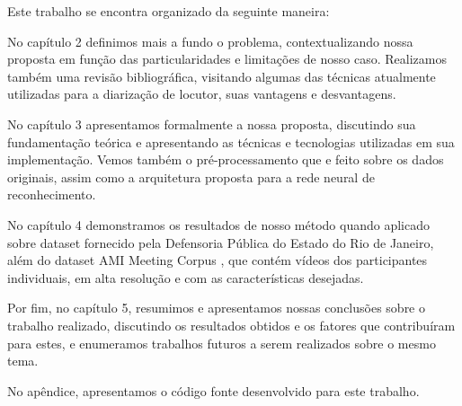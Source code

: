 Este trabalho se encontra organizado da seguinte maneira:


No capítulo 2 definimos mais a fundo o problema, contextualizando nossa proposta em função das particularidades e limitações de nosso caso. Realizamos também uma revisão bibliográfica, visitando algumas das técnicas atualmente utilizadas para a diarização de locutor, suas vantagens e desvantagens.

No capítulo 3 apresentamos formalmente a nossa proposta, discutindo sua fundamentação teórica e apresentando as técnicas e tecnologias utilizadas em sua implementação. Vemos também o pré-processamento que e feito sobre os dados originais, assim como a arquitetura proposta para a rede neural de reconhecimento.

No capítulo 4 demonstramos os resultados de nosso método quando aplicado sobre dataset fornecido pela Defensoria Pública do Estado do Rio de Janeiro, além do dataset AMI Meeting Corpus \cite{mccowanAMIMeetingCorpus2005}, que contém vídeos dos participantes individuais, em alta resolução e com as características desejadas.

Por fim, no capítulo 5, resumimos e apresentamos nossas conclusões sobre o trabalho realizado, discutindo os resultados obtidos e os fatores que contribuíram para estes, e enumeramos trabalhos futuros a serem realizados sobre o mesmo tema.

No apêndice, apresentamos o código fonte desenvolvido para este trabalho.